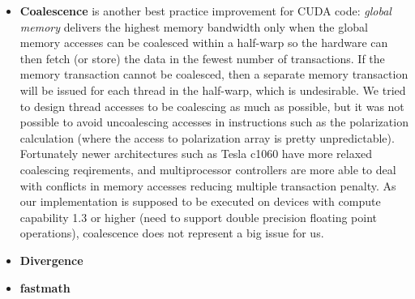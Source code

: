 \begin{itemize}
\item \textbf{Coalescence} is another best practice improvement for CUDA code: \textit{global memory} delivers the highest memory 
bandwidth only when the global memory accesses can be coalesced within a half-warp so the hardware can then fetch (or store) the data
 in the fewest number of transactions. If the memory transaction cannot be coalesced, then a separate memory transaction will be issued 
for each thread in the half-warp, which is undesirable. We tried to design thread accesses to be coalescing as much as possible, but it 
was not possible to avoid uncoalescing accesses in instructions such as the polarization calculation (where the access to polarization 
array is pretty unpredictable). Fortunately newer architectures such as Tesla c1060 have more relaxed coalescing reqirements, and 
multiprocessor controllers are more able to deal with conflicts in memory accesses reducing multiple transaction penalty.
As our implementation is supposed to be executed on devices with compute capability 1.3 or higher (need to support double precision
floating point operations), coalescence does not  represent a big issue for us.

\item \textbf{Divergence}

\item \textbf{fastmath}





\end{itemize}













